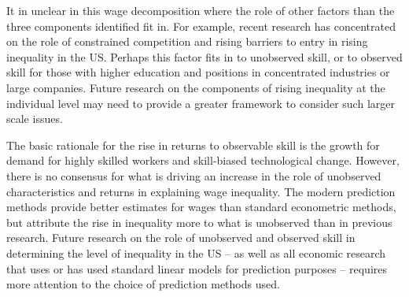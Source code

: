 \documentclass[notitlepage,12pt]{article}
\newcommand{\1}[1]{\ensuremath{\mathbb{1}\left( #1 \right)}}               %
\begin{document}
It in unclear in this wage decomposition where the role of other factors than the three components identified fit in.  For example, recent research has concentrated on the role of constrained competition and rising barriers to entry in rising inequality in the US.  Perhaps this factor fits in to unobserved skill, or to observed skill for those with higher education and positions in concentrated industries or large companies.  Future research on the components of rising inequality at the individual level may need to provide a greater framework to consider such larger scale issues.

The basic rationale for the rise in returns to observable skill is the growth for demand for highly skilled workers and skill-biased technological change.  However, there is no consensus for what is driving an increase in the role of unobserved characteristics and returns in explaining wage inequality. The modern prediction methods provide better estimates for wages than standard econometric methods, but attribute the rise in inequality more to what is unobserved than in previous research.  Future research on the role of unobserved and observed skill in determining the level of inequality in the US -- as well as all economic research that uses or has used standard linear models for prediction purposes -- requires more attention to the choice of prediction methods used.



\end{document}
